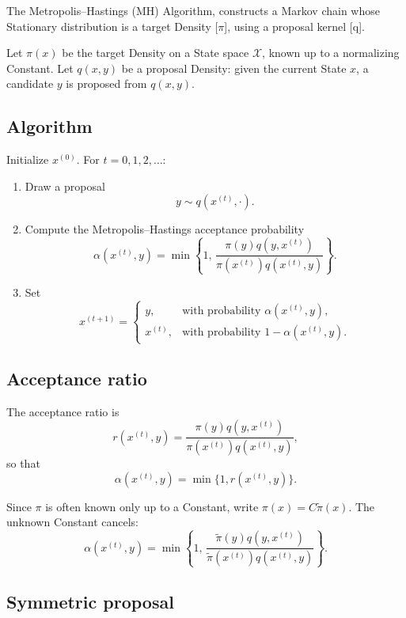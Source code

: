 \documentclass[a4paper, 10pt, onepage]{elegantbook}
\begin{document}
{The Metropolis–Hastings (MH) Algorithm, 
constructs a Markov chain whose Stationary distribution is a target Density [$\pi$], using a proposal kernel [q].

Let \(\pi(x)\) be the target Density on a State space \(\mathcal X\), known up to a
normalizing Constant. Let \(q(x,y)\) be a proposal Density: given the current State
\(x\), a candidate \(y\) is proposed from \(q(x,y)\).

\subsection{Algorithm}

Initialize \(x^{(0)}\). For \(t=0,1,2,\ldots\):

\begin{enumerate}
  \item Draw a proposal
  \[
      y \sim q\!\left(x^{(t)},\cdot\right).
  \]

  \item Compute the Metropolis--Hastings acceptance probability
  \[
      \alpha\!\left(x^{(t)},y\right)
      =
      \min\left\{
      1,\,
      \frac{\pi(y)q(y,x^{(t)})}
           {\pi(x^{(t)})q(x^{(t)},y)}
      \right\}.
  \]

  \item Set
  \[
      x^{(t+1)}
      =
      \begin{cases}
      y, & \text{with probability } \alpha\!\left(x^{(t)},y\right),\\[4pt]
      x^{(t)}, & \text{with probability } 1-\alpha\!\left(x^{(t)},y\right).
      \end{cases}
  \]
\end{enumerate}

\subsection{Acceptance ratio}

The acceptance ratio is
\[
r\!\left(x^{(t)},y\right)
=
\frac{\pi(y)q(y,x^{(t)})}
     {\pi(x^{(t)})q(x^{(t)},y)},
\]
so that
\[
\alpha\!\left(x^{(t)},y\right)=\min\{1,r\!\left(x^{(t)},y\right)\}.
\]

Since \(\pi\) is often known only up to a Constant, write
\(\pi(x)=C\tilde\pi(x)\). The unknown Constant cancels:
\[
\alpha\!\left(x^{(t)},y\right)
=
\min\left\{
1,\,
\frac{\tilde\pi(y)q(y,x^{(t)})}
     {\tilde\pi(x^{(t)})q(x^{(t)},y)}
\right\}.
\]

\subsection{Symmetric proposal}

}
\end{document}
